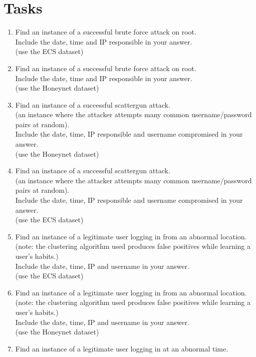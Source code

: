\chapter{Tasks}\label{append_tasks}

\begin{enumerate}
\item{Find an instance of a successful brute force attack on root. \\
Include the date, time and IP responsible in your answer.\\
(use the ECS dataset)}
\item{Find an instance of a successful brute force attack on root.\\
Include the date, time and IP responsible in your answer.\\
(use the Honeynet dataset)}
\item{Find an instance of a successful scattergun attack.\\
(an instance where the attacker attempts many common username/password pairs at random).\\
Include the date, time, IP responsible and username compromised in your answer.\\
(use the Honeynet dataset)}
\item{Find an instance of a successful scattergun attack. \\
(an instance where the attacker attempts many common username/password pairs at random). \\
Include the date, time, IP responsible and username compromised in your answer.\\
(use the ECS dataset)}
\item{Find an instance of a legitimate user logging in from an abnormal location. \\
(note: the clustering algorithm used produces false positives while learning a user's habits.) \\
Include the date, time, IP and username in your answer. \\
(use the ECS dataset)}
\item{Find an instance of a legitimate user logging in from an abnormal location. \\
(note: the clustering algorithm used produces false positives while learning a user's habits.)\\
Include the date, time, IP and username in your answer.\\
(use the Honeynet dataset)}
\item{Find an instance of a legitimate user logging in at an abnormal time.\\
}
\end{enumerate}
